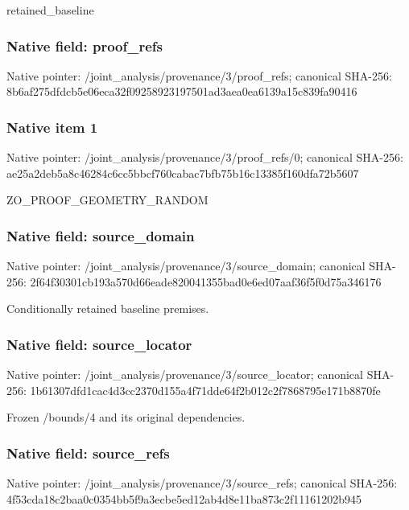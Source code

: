 \documentclass[10pt,a4paper]{article}
\begin{document}
retained\_baseline


\subsubsection{Native field: proof\_refs}


Native pointer: /joint\_analysis/provenance/3/proof\_refs; canonical SHA-256: 8b6af275dfdcb5e06eca32f0\allowbreak{}9258923197501ad3aea0ea61\allowbreak{}39a15c839fa90416



\subsubsection{Native item 1}


Native pointer: /joint\_analysis/provenan\allowbreak{}ce/3/proof\_refs/0; canonical SHA-256: ae25a2deb5a8c46284c6cc5b\allowbreak{}bcf760cabac7bfb75b16c133\allowbreak{}85f160dfa72b5607


ZO\_PROOF\_GEOMETRY\_RANDOM


\subsubsection{Native field: source\_domain}


Native pointer: /joint\_analysis/provenan\allowbreak{}ce/3/source\_domain; canonical SHA-256: 2f64f30301cb193a570d66ea\allowbreak{}de820041355bad0e6ed07aaf\allowbreak{}36f5f0d75a346176


Conditionally retained baseline premises.


\subsubsection{Native field: source\_locator}


Native pointer: /joint\_analysis/provenan\allowbreak{}ce/3/source\_locator; canonical SHA-256: 1b61307dfd1cac4d3cc2370d\allowbreak{}155a4f71dde64f2b012c2f78\allowbreak{}68795e171b8870fe


Frozen /bounds/4 and its original dependencies.


\subsubsection{Native field: source\_refs}


Native pointer: /joint\_analysis/provenan\allowbreak{}ce/3/source\_refs; canonical SHA-256: 4f53cda18c2baa0c0354bb5f\allowbreak{}9a3ecbe5ed12ab4d8e11ba87\allowbreak{}3c2f11161202b945
\end{document}
